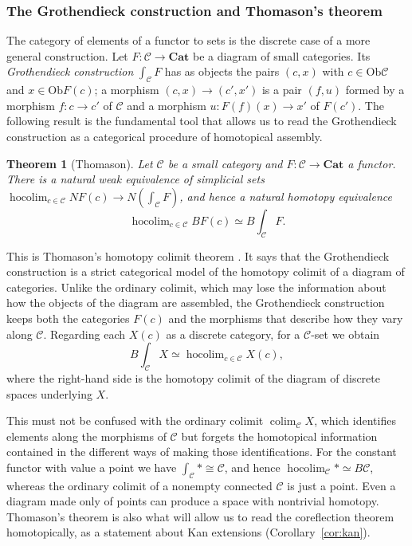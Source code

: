 \documentclass[11pt]{amsart}
\newtheorem{theorem}[teo]{Theorem}
\theoremstyle{definition}
\theoremstyle{remark}
\numberwithin{figure}{section}%
\newcommand{\CC}{\mathcal{C}}
\DeclareMathOperator{\hocolim}{hocolim}
\DeclareMathOperator*{\colim}{colim}
\newcommand{\Ob}{\mathrm{Ob}}
\newcommand{\Cat}{\mathbf{Cat}}
\begin{document}
\subsubsection{The Grothendieck construction and Thomason's theorem}

The category of elements of a functor to sets is the discrete case of a more general construction. Let $F\colon\CC\to\Cat$ be a diagram of small categories. Its \emph{Grothendieck construction} $\int_{\CC}F$ has as objects the pairs $(c,x)$ with $c\in\Ob\CC$ and $x\in\Ob F(c)$; a morphism $(c,x)\to(c',x')$ is a pair $(f,u)$ formed by a morphism $f\colon c\to c'$ of $\CC$ and a morphism $u\colon F(f)(x)\to x'$ of $F(c')$. The following result is the fundamental tool that allows us to read the Grothendieck construction as a categorical procedure of homotopical assembly.

\begin{theorem}[Thomason]
\label{thm:thomason}
Let $\CC$ be a small category and $F\colon\CC\to\Cat$ a functor. There is a natural weak equivalence of simplicial sets $\hocolim_{c\in\CC}NF(c)\to N\!\left(\int_{\CC}F\right)$, and hence a natural homotopy equivalence
\[
\hocolim_{c\in\CC}BF(c)\simeq B\!\int_{\CC}F.
\]
\end{theorem}

This is Thomason's homotopy colimit theorem \cite[Theorem~1.2]{Th}. It says that the Grothendieck construction is a strict categorical model of the homotopy colimit of a diagram of categories. Unlike the ordinary colimit, which may lose the information about how the objects of the diagram are assembled, the Grothendieck construction keeps both the categories $F(c)$ and the morphisms that describe how they vary along $\CC$. Regarding each $X(c)$ as a discrete category, for a $\CC$-set we obtain
\[
B\!\int_{\CC}X\simeq\hocolim_{c\in\CC}X(c),
\]
where the right-hand side is the homotopy colimit of the diagram of discrete spaces underlying $X$.

This must not be confused with the ordinary colimit $\colim_{\CC}X$, which identifies elements along the morphisms of $\CC$ but forgets the homotopical information contained in the different ways of making those identifications. For the constant functor with value a point we have $\int_{\CC}*\cong\CC$, and hence $\hocolim_{\CC}*\simeq B\CC$, whereas the ordinary colimit of a nonempty connected $\CC$ is just a point. Even a diagram made only of points can produce a space with nontrivial homotopy. Thomason's theorem is also what will allow us to read the coreflection theorem homotopically, as a statement about Kan extensions (Corollary~\ref{cor:kan}).
\end{document}
